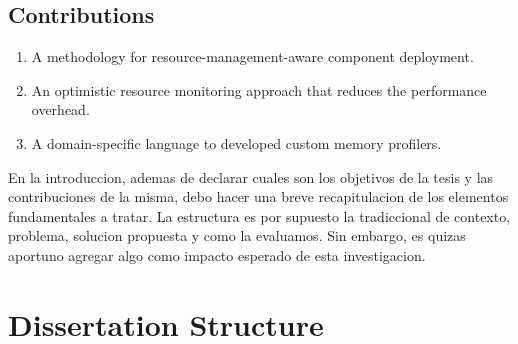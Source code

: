 \subsection{Contributions}
\begin{enumerate}
\item A methodology for resource-management-aware component deployment.
\item An optimistic resource monitoring approach that reduces the performance overhead.
\item A domain-specific language to developed custom memory profilers.
\end{enumerate}

En la introduccion, ademas de declarar cuales son los objetivos de la tesis y las contribuciones de la misma, debo hacer una breve recapitulacion de los elementos fundamentales a tratar. La estructura es por supuesto la tradiccional de contexto, problema, solucion propuesta y como la evaluamos. Sin embargo, es quizas aportuno agregar algo como impacto esperado de esta investigacion. 

\fi

\section{Dissertation Structure}